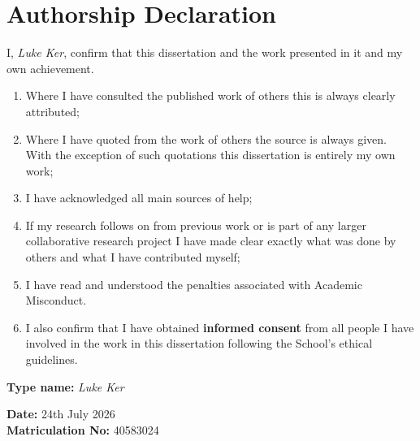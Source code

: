 \newpage
{}
\section*{Authorship Declaration}
I, \textit{Luke Ker}, confirm that this dissertation and the work presented in it and my own achievement.
\begin{enumerate}
    \item Where I have consulted the published work of others this is always clearly attributed;
    \item Where I have quoted from the work of others the source is always given. With the exception of such quotations this dissertation is entirely my own work;
    \item I have acknowledged all main sources of help;
    \item If my research follows on from previous work or is part of any larger collaborative research project I have made clear exactly what was done by others and what I have contributed myself;
    \item I have read and understood the penalties associated with Academic Misconduct.
    \item I also confirm that I have obtained \textbf{informed consent} from all people I have involved in the work in this dissertation following the School's ethical guidelines.\\
\end{enumerate}


\large

\textbf{Type name:}	\textit{Luke Ker} 

\textbf{Date:} 24th July 2026\\

\textbf{Matriculation No:} 40583024
\normalsize
\newpage
